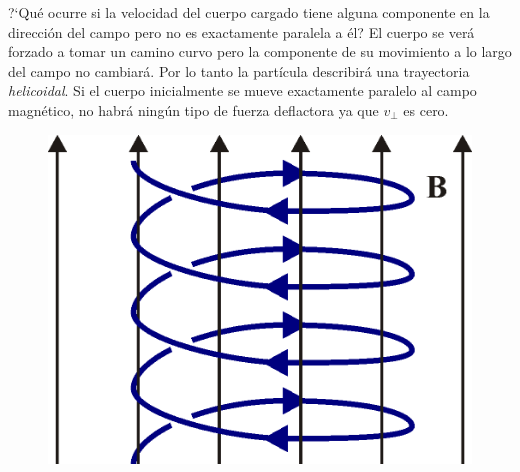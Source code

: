 \begin{multicols}{2}
	\small{?`Qué ocurre si la velocidad del cuerpo cargado tiene alguna componente en la dirección del campo pero no es exactamente paralela a él? El cuerpo se verá forzado a tomar un camino curvo pero la componente de su movimiento a lo largo del campo no cambiará. Por lo tanto la partícula describirá una trayectoria \emph{helicoidal}. Si el cuerpo inicialmente se mueve exactamente paralelo al campo magnético, no habrá ningún tipo de fuerza deflactora ya que $v_\bot$ es cero.}
\begin{figure}[H]
	\centering
	\includegraphics[width=.3\textwidth]{imagenes/imagenes26/T26IM17.png}
	\end{figure}
\end{multicols}	

